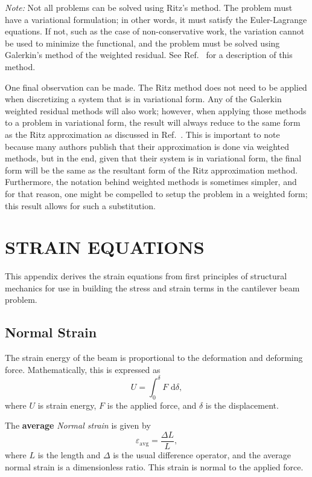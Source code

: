 \emph{Note:} Not all problems can be solved using Ritz's method. The problem must have a variational formulation; in other words, it must satisfy the Euler-Lagrange equations. If not, such as the case of non-conservative work, the variation cannot be used to minimize the functional, and the problem must be solved using Galerkin's method of the weighted residual. See Ref.~\cite{duchateau1992advanced} for a description of this method.

One final observation can be made. The Ritz method does not need to be applied when discretizing a system that is in variational form. Any of the Galerkin weighted residual methods will also work; however, when applying those methods to a problem in variational form, the result will always reduce to the same form as the Ritz approximation as discussed in Ref.~\cite{reddy1984energy}. This is important to note because many authors publish that their approximation is done via weighted methods, but in the end, given that their system is in variational form, the final form will be the same as the resultant form of the Ritz approximation method. Furthermore, the notation behind weighted methods is sometimes simpler, and for that reason, one might be compelled to setup the problem in a weighted form; this result allows for such a substitution.

\chapter{STRAIN EQUATIONS}
\label{app:strain}
This appendix derives the strain equations from first principles of structural mechanics for use in building the stress and strain terms in the cantilever beam problem.

\section{Normal Strain}
The strain energy of the beam is proportional to the deformation and deforming force. Mathematically, this is expressed as
\begin{equation}
U = \int_0^\delta F\text{ d}\delta,
\label{eq:strain.base}
\end{equation}
where $U$ is strain energy, $F$ is the applied force, and $\delta$ is the displacement.

The \textbf{average} \emph{Normal strain} is given by 
\begin{equation}
\varepsilon_{\text{avg}} = \frac{\Delta L}{L},
\label{eq:avg.normal.strain}
\end{equation}
where $L$ is the length and $\Delta$ is the usual difference operator, and the average normal strain is a dimensionless ratio. This strain is normal to the applied force.

